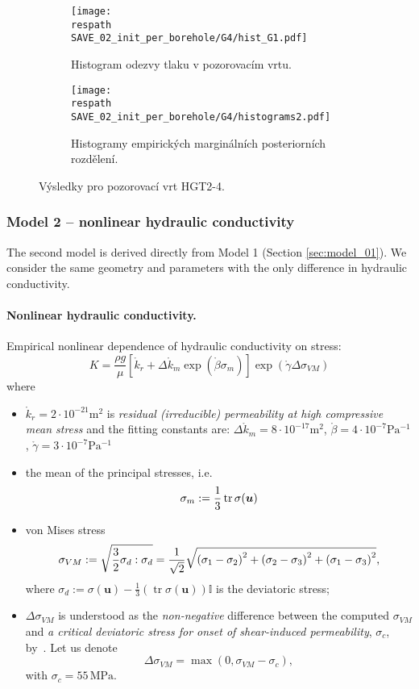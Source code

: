 \documentclass{article}
\def\unit#1{\mathrm{#1}}
\def\tr{\operatorname{tr}}
\def\vc#1{\mathbf{\boldsymbol{#1}}}     %
\def\tn#1{{\mathbb{#1}}}    %
\def\sqr#1{{{\left(#1\right)}^2}}    %
\def\uu{\vc u}
\newcommand{\respath}{results/}
\newcommand{\eq}[1]{\begin{equation}{#1}\end{equation}}
\begin{document}
\begin{figure}[htb!]
    \centering
    \begin{subfigure}[t]{0.495\textwidth}
      \texttt{[image: \\respath SAVE\_02\_init\_per\_borehole/G4/hist\_G1.pdf]}
      \caption{Histogram odezvy tlaku v pozorovacím vrtu.}
      \label{fig:hist_g4_lin}
    \end{subfigure}
    \begin{subfigure}[t]{0.495\textwidth}
      \texttt{[image: \\respath SAVE\_02\_init\_per\_borehole/G4/histograms2.pdf]}
      \caption{Histogramy empirických marginálních posteriorních rozdělení.}
      \label{fig:hist_g4_lin_params}
    \end{subfigure}
    \caption{Výsledky pro pozorovací vrt HGT2-4.}
    \label{fig:hist_G4}
\end{figure}


\pagebreak

\subsubsection{Model 2 -- nonlinear hydraulic conductivity}
The second model is derived directly from Model 1 (Section \ref{sec:model_01}).
We consider the same geometry and parameters with the only difference in hydraulic conductivity.

\paragraph{Nonlinear hydraulic conductivity.}
Empirical nonlinear dependence of hydraulic conductivity on stress:
\eq{ K = \frac{\rho g}{\mu} \left[\mathring{k}_r + \Delta \mathring{k}_m\exp(\mathring\beta\sigma_m)\right]\exp(\mathring\gamma\Delta\sigma_{VM}) }
where
\begin{itemize}
    \item $\mathring k_r=2\cdot10^{-21}\unit{m^2}$ is \emph{residual (irreducible) permeability at high compressive mean stress}
    and the fitting constants are: $\Delta \mathring{k}_m=8\cdot10^{-17}\unit{m^2}$,  $\mathring\beta=4\cdot10^{-7}\unit{Pa^{-1}}$, $\mathring\gamma=3\cdot10^{-7}\unit{Pa^{-1}}$
    \item the mean of the principal stresses, i.e.
        \eq{\label{eq:mean_stress} \sigma_m:=\frac13\tr\tn\sigma(\uu)}
    \item von Mises stress
        \eq{\label{eq:von_mises} \sigma_{VM}:=\sqrt{\frac32\tn\sigma_d:\tn\sigma_d} 
            = \frac{1}{\sqrt{2}}\sqrt{\sqr{\sigma_1-\sigma_2}+\sqr{\sigma_2-\sigma_3}+\sqr{\sigma_1-\sigma_3}},}
        where $\tn\sigma_d:=\tn\sigma(\uu)-\frac13(\tr\tn\sigma(\uu))\tn I$ is the deviatoric stress;
    \item $\Delta\sigma_{VM}$ is understood as the \emph{non-negative} difference between the computed $\sigma_{VM}$ and
        \emph{a critical deviatoric stress for onset of shear-induced permeability}, $\sigma_{c}$, by~\cite{rutqvist_fractured_2015}.
        Let us denote
        \eq{\Delta\sigma_{VM} = \max\left(0, \sigma_{VM} - \sigma_{c}\right),}
        with $\sigma_{c}=55\,\unit{MPa}$.
\end{itemize}
\end{document}
